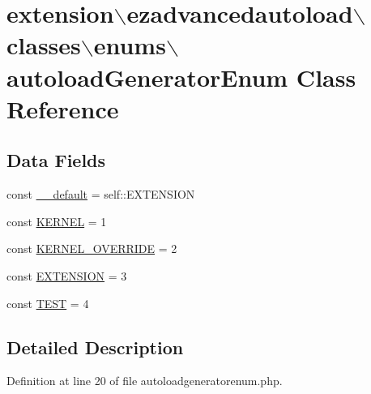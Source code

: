 \hypertarget{classextension_1_1ezadvancedautoload_1_1classes_1_1enums_1_1autoload_generator_enum}{\section{extension$\backslash$ezadvancedautoload$\backslash$classes$\backslash$enums$\backslash$autoload\-Generator\-Enum Class Reference}
\label{classextension_1_1ezadvancedautoload_1_1classes_1_1enums_1_1autoload_generator_enum}
}
\subsection*{Data Fields}
\begin{DoxyCompactItemize}
\item 
const \hyperlink{classextension_1_1ezadvancedautoload_1_1classes_1_1enums_1_1autoload_generator_enum_aa803b338dcea315c5ba70ecdc103f306}{\-\_\-\-\_\-default} = self\-::\-E\-X\-T\-E\-N\-S\-I\-O\-N
\item 
const \hyperlink{classextension_1_1ezadvancedautoload_1_1classes_1_1enums_1_1autoload_generator_enum_a100ec557541f513d12bb988c9afdb99c}{K\-E\-R\-N\-E\-L} = 1
\item 
const \hyperlink{classextension_1_1ezadvancedautoload_1_1classes_1_1enums_1_1autoload_generator_enum_ab1c7c17892da9cd208eb3eb9ea4a55a4}{K\-E\-R\-N\-E\-L\-\_\-\-O\-V\-E\-R\-R\-I\-D\-E} = 2
\item 
const \hyperlink{classextension_1_1ezadvancedautoload_1_1classes_1_1enums_1_1autoload_generator_enum_a46f25431900773dbb0f22b71add686ce}{E\-X\-T\-E\-N\-S\-I\-O\-N} = 3
\item 
const \hyperlink{classextension_1_1ezadvancedautoload_1_1classes_1_1enums_1_1autoload_generator_enum_a7c160c4cf91bf4721a2ea9af96f4624a}{T\-E\-S\-T} = 4
\end{DoxyCompactItemize}


\subsection{Detailed Description}


Definition at line 20 of file autoloadgeneratorenum.\-php.




